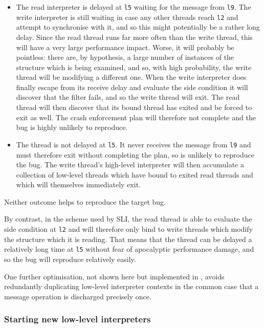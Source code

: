 \begin{itemize}
\item
  The read interpreter is delayed at \verb|l5| waiting for the message
  from \verb|l9|.  The write interpreter is still waiting in case any
  other threads reach \verb|l2| and attempt to synchronise with it,
  and so this might potentially be a rather long delay.  Since the
  read thread runs far more often than the write thread, this will
  have a very large performance impact.  Worse, it will probably be
  pointless: there are, by hypothesis, a large number of instances of
  the structure which is being examined, and so, with high
  probability, the write thread will be modifying a different one.
  When the write interpreter does finally escape from its receive
  delay and evaluate the side condition it will discover that the
  filter fails, and so the write thread will exit.  The read thread
  will then discover that its bound thread has exited and be forced to
  exit as well.  The crash enforcement plan will therefore not
  complete and the bug is highly unlikely to reproduce.
\item
  The thread is not delayed at \verb|l5|.  It never receives the
  message from \verb|l9| and must therefore exit without completing
  the plan, so is unlikely to reproduce the bug.  The write thread's
  high-level interpreter will then accumulate a collection of
  low-level threads which have bound to exited read threads and which
  will themselves immediately exit.
\end{itemize}

Neither outcome helps to reproduce the target bug.

By contrast, in the scheme used by SLI, the read thread is able to
evaluate the side condition at \verb|l2| and will therefore only bind
to write threads which modify the structure which it is reading.  That
means that the thread can be delayed a relatively long time at
\verb|l5| without fear of apocalyptic performance damage, and so the
bug will reproduce relatively easily.

One further optimisation, not shown here but implemented in
{\implementation}, avoids redundantly duplicating low-level
interpreter contexts in the common case that a message operation is
discharged precisely once.

\subsubsection{Starting new low-level interpreters}

